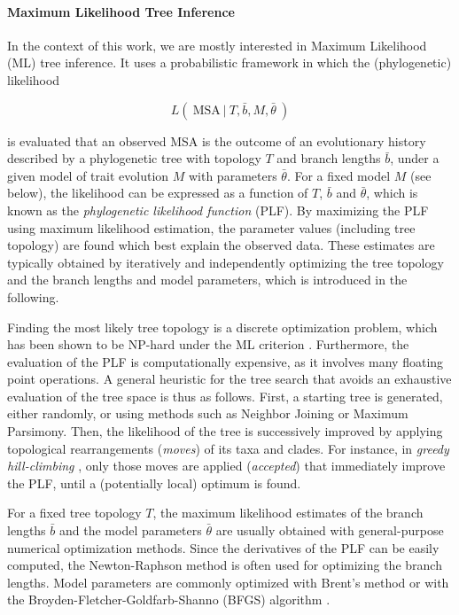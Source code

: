 \paragraph{Maximum Likelihood Tree Inference}
\label{ch:Foundations:sec:TreeOfLife:sub:TreeInference:par:MLTreeInference}

In the context of this work, we are mostly interested in Maximum Likelihood (ML) tree inference.
It uses a probabilistic framework in which the (phylogenetic) likelihood

\begin{equation}
    L(~ \mbox{MSA} ~|~ T, \bar{b}, M, \bar{\theta} ~)
\end{equation}

is evaluated that an observed MSA is the outcome of an evolutionary history described by a phylogenetic tree
with topology $T$ and branch lengths $\bar{b}$, under a given model of trait evolution $M$ with parameters $\bar{\theta}$.
For a fixed model $M$ (see below), the likelihood can be expressed as a function of $T$, $\bar{b}$ and $\bar{\theta}$,
which is known as the \emph{phylogenetic likelihood function} (PLF).
By maximizing the PLF using maximum likelihood estimation,
the parameter values (including tree topology) are found which best explain the observed data.
These estimates are typically obtained by iteratively and independently optimizing
the tree topology and the branch lengths and model parameters,
which is introduced in the following.

Finding the most likely tree topology is a discrete optimization problem,
which has been shown to be NP-hard under the ML criterion \cite{Chor2005}.
Furthermore, the evaluation of the PLF is computationally expensive,
as it involves many floating point operations.
A general heuristic for the tree search that avoids an exhaustive evaluation of the tree space is thus as follows.
First, a starting tree is generated, either randomly, or using methods such as Neighbor Joining or Maximum Parsimony.
Then, the likelihood of the tree is successively improved
by applying topological rearrangements (\emph{moves}) of its taxa and clades.
For instance, in \emph{greedy hill-climbing} \cite{Stamatakis2014}, only those moves are applied (\emph{accepted})
that immediately improve the PLF, until a (potentially local) optimum is found.

For a fixed tree topology $T$, the maximum likelihood estimates
of the branch lengths $\bar{b}$ and the model parameters $\bar{\theta}$
are usually obtained with general-purpose numerical optimization methods.
Since the derivatives of the PLF can be easily computed,
the Newton-Raphson method \cite{Ypma1995} is often used for optimizing the branch lengths.
Model parameters are commonly optimized with Brent's method \cite{Brent1971}
or with the Broyden-Fletcher-Goldfarb-Shanno (BFGS) algorithm \cite{Fletcher1987}.

